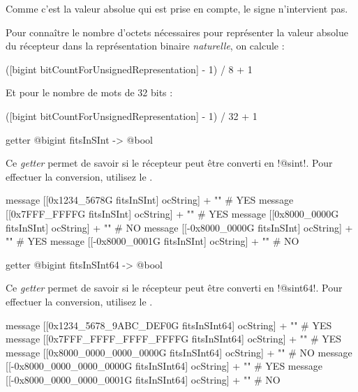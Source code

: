 Comme c'est la valeur absolue qui est prise en compte, le signe n'intervient pas.

Pour connaître le nombre d'octets nécessaires pour représenter la valeur absolue du récepteur dans la représentation binaire \emph{naturelle}, on calcule :
\begin{galgas}
([bigint bitCountForUnsignedRepresentation] - 1) / 8 + 1 
\end{galgas}

Et pour le nombre de mots de 32 bits :
\begin{galgas}
([bigint bitCountForUnsignedRepresentation] - 1) / 32 + 1 
\end{galgas}


\begin{galgasbox}
getter @bigint fitsInSInt -> @bool
\end{galgasbox}

Ce \emph{getter} permet de savoir si le récepteur peut être converti en \ggs!@sint!. Pour effectuer la conversion, utilisez le .

\begin{galgas}
message [[0x1234_5678G fitsInSInt] ocString] + "\n" # YES
message [[0x7FFF_FFFFG fitsInSInt] ocString] + "\n" # YES
message [[0x8000_0000G fitsInSInt] ocString] + "\n" # NO
message [[-0x8000_0000G fitsInSInt] ocString] + "\n" # YES
message [[-0x8000_0001G fitsInSInt] ocString] + "\n" # NO
\end{galgas}





\begin{galgasbox}
getter @bigint fitsInSInt64 -> @bool
\end{galgasbox}

Ce \emph{getter} permet de savoir si le récepteur peut être converti en \ggs!@sint64!. Pour effectuer la conversion, utilisez le .

\begin{galgas}
message [[0x1234_5678_9ABC_DEF0G fitsInSInt64] ocString] + "\n" # YES
message [[0x7FFF_FFFF_FFFF_FFFFG fitsInSInt64] ocString] + "\n" # YES
message [[0x8000_0000_0000_0000G fitsInSInt64] ocString] + "\n" # NO
message [[-0x8000_0000_0000_0000G fitsInSInt64] ocString] + "\n" # YES
message [[-0x8000_0000_0000_0001G fitsInSInt64] ocString] + "\n" # NO
\end{galgas}




